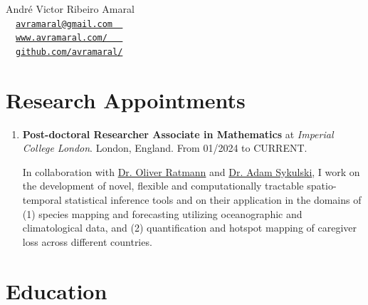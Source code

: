 \documentclass[10pt, ]{article}
\begin{document}
	
	\begin{center}
		{\LARGE André Victor Ribeiro Amaral} \\ \vspace{3pt}
		{\small\faEnvelope~~\href{mailto:avramaral@gmail.com}{\texttt{avramaral@gmail.com~~}}} \\
		{\small\faDesktop~~\href{https://www.avramaral.com/}{\texttt{www.avramaral.com/~~~}}}	\\
		{\small\faGithubAlt~~\href{https://github.com/avramaral/}{\texttt{github.com/avramaral/}}}	
	\end{center}
	
	\vspace{-12pt}
	\section*{Research Appointments} \vspace{-5pt}
	
	\begin{enumerate}[noitemsep, topsep=0pt]
		\item \textbf{Post-doctoral Researcher Associate in Mathematics} at \textit{Imperial College London}. London, England. From 01/2024 to CURRENT. \vspace{3pt}
		
		In collaboration with \href{https://www.imperial.ac.uk/people/oliver.ratmann05}{Dr. Oliver Ratmann} and \href{https://www.imperial.ac.uk/people/adam.sykulski}{Dr. Adam Sykulski}, I work on the development of novel, flexible and computationally tractable spatio-temporal statistical inference tools and on their application in the domains of (1) species mapping and forecasting utilizing oceanographic and climatological data, and (2) quantification and hotspot mapping of caregiver loss across different countries.
		
	\end{enumerate}
	
	\vspace{10pt}
	
	\vspace{-12pt}
	\section*{Education} \vspace{-5pt}
	
\end{document}
